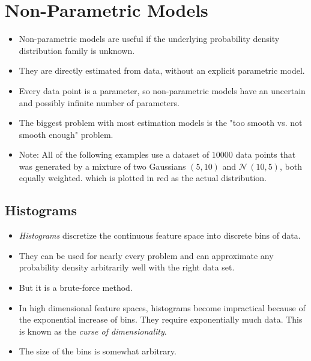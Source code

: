 \documentclass[a4paper, 11pt, accentcolor = tud3b]{tudreport}
\begin{document}
		\section{Non-Parametric Models}
			\begin{itemize}
				\item Non-parametric models are useful if the underlying probability density distribution family is unknown.
				\item They are directly estimated from data, without an explicit parametric model.
				\item Every data point is a parameter, so non-parametric models have an uncertain and possibly infinite number of parameters.
				\item The biggest problem with most estimation models is the "too smooth vs. not smooth enough" problem.
				\item Note: All of the following examples use a dataset of \(10000\) data points that was generated by a mixture of two Gaussians \(
				(5, 10) \) and \( \mathcal{N}\,(10, 5) \), both equally weighted. which is plotted in red as the actual distribution.
			\end{itemize}

			\subsection{Histograms}
				\begin{itemize}
					\item \emph{Histograms} discretize the continuous feature space into discrete bins of data.
					\item They can be used for nearly every problem and can approximate any probability density arbitrarily well with the right data set.
					\item But it is a brute-force method.
					\item In high dimensional feature spaces, histograms become impractical because of the exponential increase of bins. They require exponentially much data. This is known as the \emph{curse of dimensionality}.
					\item The size of the bins is somewhat arbitrary.
				\end{itemize}
\end{document}
